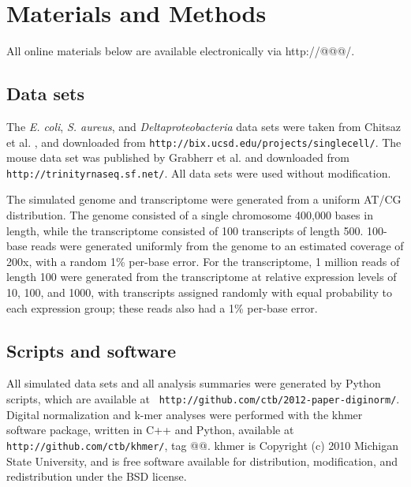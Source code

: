 \documentclass[10pt]{article}
\begin{document}



\section*{Materials and Methods}

All online materials below are available electronically via http://@@@/.

\subsection*{Data sets}

The {\em E. coli}, {\em S. aureus}, and {\em Deltaproteobacteria} data
sets were taken from Chitsaz et al. \cite{pubmed21926975}, and
downloaded from {\tt http://bix.ucsd.edu/projects/singlecell/}.  The
mouse data set was published by Grabherr et al. \cite{pubmed21572440}
and downloaded from {\tt http://trinityrnaseq.sf.net/}.  All data sets
were used without modification.

The simulated genome and transcriptome were generated from a uniform
AT/CG distribution.  The genome consisted of a single chromosome
400,000 bases in length, while the transcriptome consisted of 100
transcripts of length 500.  100-base reads were generated uniformly
from the genome to an estimated coverage of 200x, with a random 1\%
per-base error.  For the transcriptome, 1 million reads of length 100
were generated from the transcriptome at relative expression levels of
10, 100, and 1000, with transcripts assigned randomly with equal
probability to each expression group; these reads also had a 1\%
per-base error.

\subsection*{Scripts and software}

All simulated data sets and all analysis summaries were generated by
Python scripts, which are available at {\tt
  http://github.com/ctb/2012-paper-diginorm/}.  Digital normalization
and k-mer analyses were performed with the khmer software package,
written in C++ and Python, available at {\tt
  http://github.com/ctb/khmer/}, tag @@.  khmer is Copyright (c) 2010
Michigan State University, and is free software available for
distribution, modification, and redistribution under the BSD license.
\end{document}
